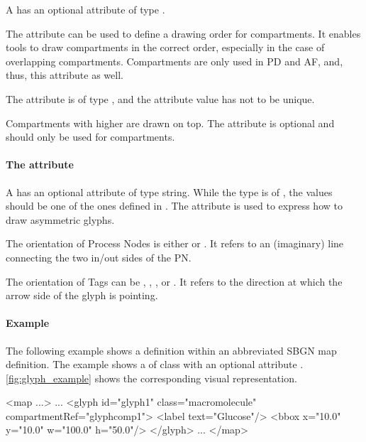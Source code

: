 A \Glyph has an optional attribute  of type
.

The  attribute can be used to define a drawing order for compartments. It enables tools to draw compartments in the correct order, especially in the case of overlapping compartments. Compartments are only used in PD and AF, and, thus, this attribute as well.

The attribute is of type , and the attribute value has not to be unique.


Compartments with higher  are drawn on top. The attribute is optional and should only be used for compartments.

\paragraph{The \fixttspace{} attribute}

A \Glyph has an optional attribute  of type string. While the type is of , the values should be one of the ones defined in . The  attribute is used to express how to draw asymmetric glyphs.

The orientation of Process Nodes is either  or . It refers to an (imaginary) line connecting the two in/out sides of the PN.

The orientation of Tags can be , , , or . It refers to the direction at which the arrow side of the glyph is pointing.

\paragraph{Example}

The following example shows a \Glyph definition within an abbreviated SBGN map definition. The example shows a \Glyph of class  with an optional attribute . \ref{fig:glyph_example} shows the corresponding visual representation.

\begin{example}
<map ...>
    ...
    <glyph id="glyph1" class="macromolecule" compartmentRef="glyphcomp1">
        <label text="Glucose"/>
        <bbox x="10.0" y="10.0" w="100.0" h="50.0"/>
    </glyph>
    ...
</map>
\end{example}

